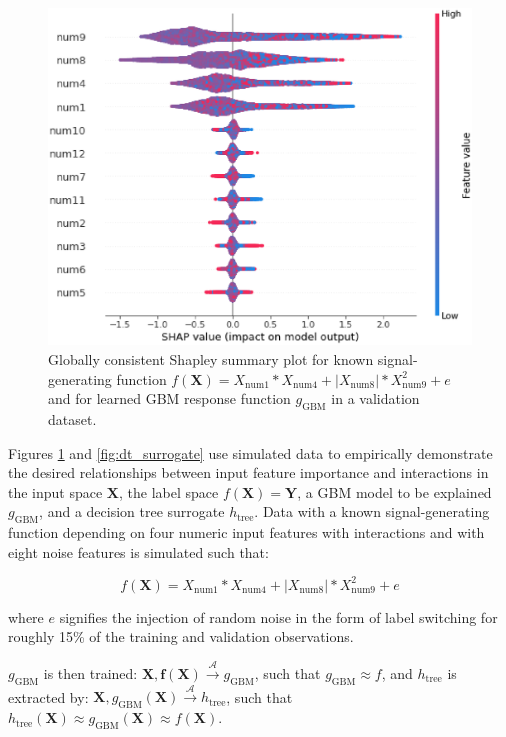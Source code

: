 \documentclass[sigconf, review]{acmart}
\begin{document}
\begin{figure}
	\begin{center}
		\includegraphics[scale=0.4]{img/figure_2.eps}
		\caption{Globally consistent Shapley summary plot for known signal-generating function $f(\mathbf{X}) = X_{\text{num}1} * X_{\text{num}4} + |X_{\text{num}8}| * X_{\text{num}9}^2 + e$ and for learned GBM response function $g_{\text{GBM}}$ in a validation dataset.}
		\label{fig:global_shapley}
	\end{center}
\end{figure}

Figures \ref{fig:global_shapley} and \ref{fig:dt_surrogate} use simulated data to empirically demonstrate the desired relationships between input feature importance and interactions in the input space $\mathbf{X}$, the label space $f(\mathbf{X}) = \mathbf{Y}$, a GBM model to be explained $g_{\text{GBM}}$, and a decision tree surrogate $h_{\text{tree}}$. Data with a known signal-generating function depending on four numeric input features with interactions and with eight noise features is simulated such that: 

\begin{equation}
\label{eq:f}
f(\mathbf{X}) = X_{\text{num}1} * X_{\text{num}4} + |X_{\text{num}8}| * X_{\text{num}9}^2 + e
\end{equation}

\noindent where $e$ signifies the injection of random noise in the form of label switching for roughly 15\% of the training and validation observations. 

$g_{\text{GBM}}$ is then trained: $ \mathbf{X}, \mathbf{f(X)} \xrightarrow{\mathcal{A}} g_{\text{GBM}}$, such that $g_{\text{GBM}} \approx f$, and $h_{\text{tree}}$ is extracted by: $\mathbf{X}, g_{\text{GBM}}(\mathbf{X}) \xrightarrow{\mathcal{A}} h_{\text{tree}}$,  such that\\ $h_{\text{tree}}(\mathbf{X}) \approx g_{\text{GBM}}(\mathbf{X}) \approx f(\mathbf{X})$.
\end{document}
